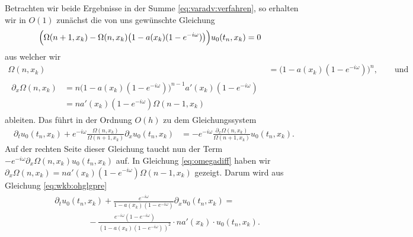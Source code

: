 Betrachten wir beide Ergebnisse in der Summe \eqref{eq:varadv:verfahren}, so erhalten wir in $O(1)$ zunächst die von uns gewünschte Gleichung
\begin{align}
\Bigl( \Omega(n+1, x_k)  - \Omega(n,x_k) \bigl(1 - a(x_k) (1-e^{-i\omega}) \bigr) \Bigr) u_0(t_n, x_k) &= 0
\end{align}
aus welcher wir
\begin{align}
\Omega(n,x_k) &= \bigl(1 - a(x_k) (1-e^{-i\omega}) \bigr)^n, \qquad \text{und}\\
\begin{split}\label{eq:omegadiff}
\partial_x \Omega(n,x_k) &= n \bigl(1 - a(x_k) (1-e^{-i\omega}) \bigr)^{n-1} a'(x_k) (1-e^{-i\omega})\\
&= n a'(x_k) (1-e^{-i\omega}) \Omega(n-1, x_k)
\end{split}
\end{align}
ableiten.
Das führt in der Ordnung $O(h)$ zu dem Gleichungssystem
\begin{align}\label{eq:wkb:ohglgpre}
\partial_t u_0(t_n, x_k) + e^{-i \omega} \frac{\Omega(n,x_k)}{\Omega(n+1, x_k)} \partial_x u_0(t_n, x_k) &= - e^{-i \omega} \frac{\partial_x \Omega(n,x_k)}{\Omega(n+1, x_k)} u_0(t_n, x_k).
\end{align}
Auf der rechten Seite dieser Gleichung taucht nun der Term $- e^{-i \omega} \partial_x \Omega(n,x_k) u_0(t_n, x_k)$ auf.
In Gleichung \eqref{eq:omegadiff} haben wir $\partial_x \Omega(n,x_k) = n a'(x_k) (1-e^{-i\omega}) \Omega(n-1, x_k)$ gezeigt.
Darum wird aus Gleichung \eqref{eq:wkb:ohglgpre} 
\begin{align}\label{eq:wkb:ohpost}
\begin{split}
&\partial_t u_0(t_n, x_k) + \frac{e^{-i \omega}}{1 - a(x_k) (1-e^{-i\omega})} \partial_x u_0(t_n, x_k) =\\
&\qquad \qquad - \frac{e^{-i \omega} (1 - e^{-i\omega})}{(1 - a(x_k) (1-e^{-i\omega}))^2} \cdot n a'(x_k) \cdot u_0(t_n, x_k).
\end{split}
\end{align}


